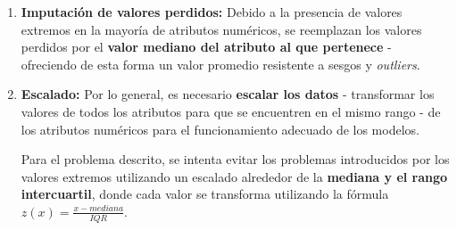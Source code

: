 \begin{itemize}[leftmargin=*, parsep=1pt, itemsep=1pt, topsep=4pt]
	\begin{enumerate}
		\item \textbf{Imputación de valores perdidos:} Debido a la presencia de valores extremos en la mayoría de atributos numéricos, se reemplazan los valores perdidos por el \textbf{valor mediano del atributo al que pertenece} - ofreciendo de esta forma un valor promedio resistente a sesgos y \textit{outliers}.
		\item \textbf{Escalado:} Por lo general, es necesario \textbf{escalar los datos} - transformar los valores de todos los atributos para que se encuentren en el mismo rango - de los atributos numéricos para el funcionamiento adecuado de los modelos.
		
		Para el problema descrito, se intenta evitar los problemas introducidos por los valores extremos utilizando un escalado alrededor de la \textbf{mediana y el rango intercuartil}, donde cada valor se transforma utilizando la fórmula $z(x) = \frac{x - mediana}{IQR}$. 
	\end{enumerate}
\end{itemize}